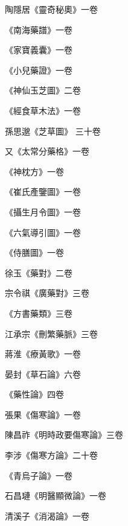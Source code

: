 \begin{pinyinscope}
 陶隱居《靈奇秘奧》一卷



 《南海藥譜》一卷



 《家寶義囊》一卷



 《小兒藥證》一卷



 《神仙玉芝圖》二卷



 《經食草木法》一卷



 孫思邈《芝草圖》
 三十卷



 又《太常分藥格》一卷



 《神枕方》一卷



 《崔氏產鑒圖》一卷



 《攝生月令圖》一卷



 《六氣導引圖》一卷



 《侍膳圖》一卷



 徐玉《藥對》二卷



 宗令祺《廣藥對》三卷



 《方書藥類》三卷



 江承宗《刪繁藥脈》三卷



 蔣淮《療黃歌》一卷



 晏封《草石論》六卷



 《藥性論》四卷



 張果《傷寒論》一卷



 陳昌祚《明時政要傷寒論》三卷



 李涉《傷寒方論》二十卷



 《青烏子論》一卷



 石昌璉《明醫顯微論》一卷



 清溪子《消渴論》一卷




\end{pinyinscope}
